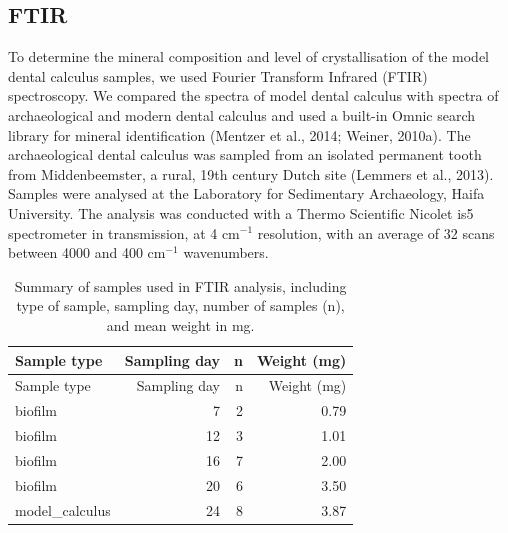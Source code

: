 \documentclass[
]{article}
\begin{document}
\hypertarget{ftir}{%
\subsection{FTIR}\label{ftir}}

To determine the mineral composition and level of crystallisation of the
model dental calculus samples, we used Fourier Transform Infrared (FTIR)
spectroscopy. We compared the spectra of model dental calculus with
spectra of archaeological and modern dental calculus and used a built-in
Omnic search library for mineral identification (Mentzer et al., 2014;
Weiner, 2010a). The archaeological dental calculus was sampled from an
isolated permanent tooth from Middenbeemster, a rural, 19th century
Dutch site (Lemmers et al., 2013). Samples were analysed at the
Laboratory for Sedimentary Archaeology, Haifa University. The analysis
was conducted with a Thermo Scientific Nicolet is5 spectrometer in
transmission, at 4 cm\(^{-1}\) resolution, with an average of 32 scans
between 4000 and 400 cm\(^{-1}\) wavenumbers.

\hypertarget{tbl-ftir-byoc}{}
\begin{longtable}[]{@{}lrrr@{}}
\caption{\label{tbl-ftir-byoc}Summary of samples used in FTIR analysis,
including type of sample, sampling day, number of samples (n), and mean
weight in mg.}\tabularnewline
\toprule()
Sample type & Sampling day & n & Weight (mg) \\
\midrule()
\endfirsthead
\toprule()
Sample type & Sampling day & n & Weight (mg) \\
\midrule()
\endhead
biofilm & 7 & 2 & 0.79 \\
biofilm & 12 & 3 & 1.01 \\
biofilm & 16 & 7 & 2.00 \\
biofilm & 20 & 6 & 3.50 \\
model\_calculus & 24 & 8 & 3.87 \\
\bottomrule()
\end{longtable}
\end{document}
